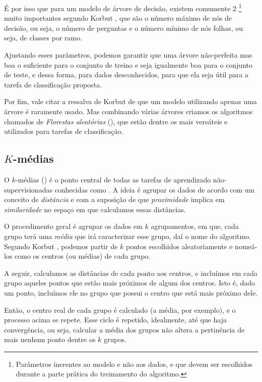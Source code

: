 É por isso que para um modelo de árvore de decisão, existem comumente $2$ \footnote{Parâmetros inerentes ao modelo e não aos dados, e que devem ser escolhidos durante a parte prática do treinamento do algoritmo.} muito importantes segundo Korbut \citep{korbut}, que são o número máximo de nós de decisão, ou seja, o número de perguntas e o número mínimo de nós folhas, ou seja, de classes por ramo.

Ajustando esses parâmetros, podemos garantir que uma árvore não-perfeita mas boa o suficiente para o conjunto de treino e seja igualmente boa para o conjunto de teste, e dessa forma, para dados desconhecidos, para que ela seja útil para a tarefa de classificação proposta.

Por fim, vale citar a ressalva de Korbut \citep{korbut} de que um modelo utilizando apenas uma árvore é raramente usado. Mas combinando várias árvores criamos os algoritmos chamados de \emph{Florestas aleatórias} (), que estão dentre os mais versáteis e utilizados para tarefas de classificação.

\subsection{$K$-médias}

O $k$-médias () é o ponto central de todas as tarefas de aprendizado não-supervisionadas conhecidas como . A ideia é agrupar os dados de acordo com um conceito de \emph{distância} e com a suposição de que \emph{proximidade} implica em \emph{similaridade} no espaço em que calculamos essas distâncias.

O procedimento geral é agrupar os dados em $k$ agrupamentos, em que, cada grupo terá uma \emph{média} que irá caracterizar esse grupo, daí o nome do algoritmo. Segundo Korbut \citep{korbut}, podemos partir de $k$ pontos escolhidos aleatoriamente e nomeá-los como os centros (ou médias) de cada grupo.

A seguir, calculamos as distâncias de cada ponto aos centros, e incluímos em cada grupo aqueles pontos que estão mais próximos de algum dos centros. Isto é, dado um ponto, incluímos ele no grupo que possui o centro que está mais próximo dele.

Então, o centro real de cada grupo é calculado (a média, por exemplo), e o processo acima se repete. Esse ciclo é repetido, idealmente, até que haja convergência, ou seja, calcular a média dos grupos não altera a pertinência de mais nenhum ponto dentre os $k$ grupos.

